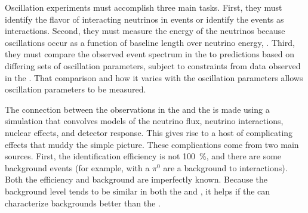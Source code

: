 Oscillation experiments must accomplish three main tasks. First, they must identify the flavor of interacting neutrinos in  events or identify the events as  interactions. Second, they must measure the energy of the neutrinos because oscillations occur as a function of baseline length over neutrino energy, . Third, they must compare the observed event spectrum in the  to  predictions based on differing sets of oscillation parameters, subject to constraints from data observed in the .  That comparison and how it varies with the oscillation parameters allows oscillation parameters to be measured.

The connection between the observations in the  and the  is made using a simulation that convolves models of the neutrino flux, neutrino interactions, nuclear effects, and detector response.
This gives rise to a host of complicating effects that 
muddy the simple picture. These complications come from two main sources. First, the identification efficiency is not \SI{100}{\%}, and there are
some background events (for example,  with a $\pi^0$ are a background to \nue {} interactions). Both the efficiency and background are imperfectly known. %
Because the background level tends to be similar in both the  and , it helps if the  can characterize backgrounds better than the . %
%

